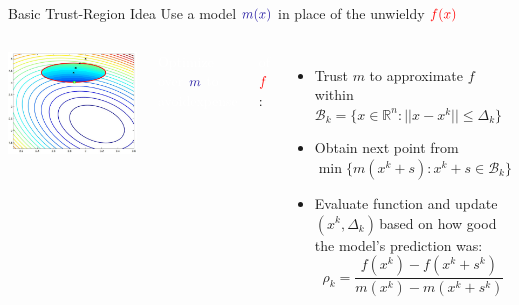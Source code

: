 \documentclass[handout,aspectratio=54]{beamer}
\numberwithin{theorem}{section}
\begin{document}
\begin{frame}{Basic Trust-Region Idea}
Use a model $\textcolor{blue}{m(x)}$ in place of the unwieldy $\textcolor{red}{f(x)}$

\begin{columns}
\includegraphics[width=\textwidth]{fig/22-4.jpg}

\colorbox[rgb]{0.5,0.6,0.7}{\textcolor{white}{Optimize over }$\textcolor{blue}{m}$ \textcolor{white}{to avoidexpense }}

\colorbox[rgb]{0.5,0.6,0.7}{\textcolor{white}{of} $\textcolor{red}{f}$:}

\begin{itemize}
\item Trust $m$ to approximate $f$ within $ \mathcal{B}_k=\{x\in\mathbb{R}^n:||x-x^k||\le \Delta_k\}$
\item Obtain next point from $\min\{m(x^k+s):x^k+s\in  \mathcal{B}_k\}$
\item Evaluate function and update $(x^k, \Delta_k)$\,based on how good the model's prediction was:
\begin{equation*}
\rho_k=\frac{f(x^k)-f(x^k+s^k)}{m(x^k)-m(x^k+s^k)}
\end{equation*}
\end{itemize}

\footnotesize{}
\end{columns}
\end{frame}
\end{document}
